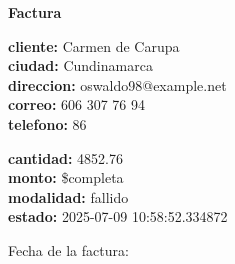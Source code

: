 \documentclass{article}
\begin{document}
\begin{center}
    {\LARGE \textbf{Factura}}\\[1cm]
\end{center}

\textbf{cliente:} Carmen de Carupa \\
\textbf{ciudad:} Cundinamarca \\
\textbf{direccion:} oswaldo98@example.net \\
\textbf{correo:} 606 307 76 94 \\
\textbf{telefono:} 86 \\

\vspace{0.5cm}

\textbf{cantidad:} 4852.76 \\
\textbf{monto:} \$completa \\
\textbf{modalidad:} fallido \\
\textbf{estado:} 2025-07-09 10:58:52.334872 \\

\vspace{1cm}

Fecha de la factura: 
\end{document}
